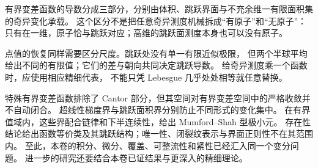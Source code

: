 





\begin{chaptersummary}
有界变差函数的导数分成三部分，分别由体积、跳跃界面与不充余维一有限面积集的奇异变化承载。
这个区分不是把任意奇异测度机械拆成“有原子”和“无原子”：
只有在一维，原子恰与跳跃对应；高维的跳跃面测度本身也可以没有原子。

\ProseParagraphBreak

点值的恢复同样需要区分尺度。跳跃处没有单一有限近似极限，
但两个半球平均给出不同的有限值；它们的差与朝向共同决定跳跃导数。
给奇异测度乘一个函数时，应使用相应精细代表，
不能只凭 Lebesgue 几乎处处相等就任意替换。

\ProseParagraphBreak

特殊有界变差函数排除了 Cantor 部分，但其空间对有界变差空间中的严格收敛并不自动闭合。
超线性梯度界与跳跃面积界分别防止不同形式的变化集中。
在有界值域内，这些界配合链律和下半连续性，给出 Mumford–Shah 型极小元。
存在性结论给出函数等价类及其跳跃结构；唯一性、闭裂纹表示与界面正则性不在其范围内。
至此，本卷的积分、微分、覆盖、可整流性和紧性已经汇入同一个变分问题。
进一步的研究还要结合本卷已证结果与更深入的精细理论。
\end{chaptersummary}

\BookExercises


